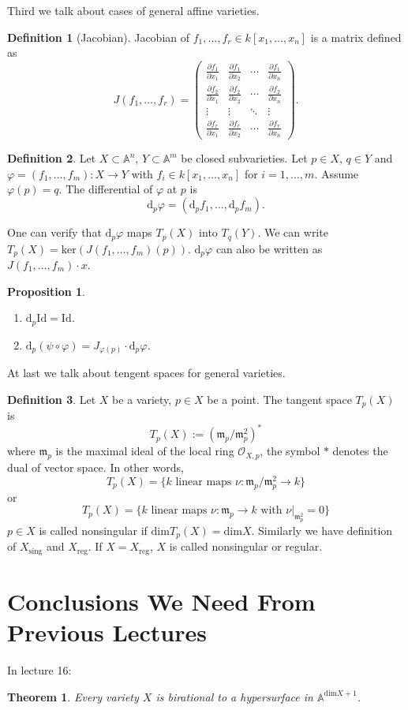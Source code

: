 \documentclass{amsart}
\theoremstyle{plain}
\newtheorem{theorem}{Theorem}
\newtheorem{proposition}{Proposition}
\theoremstyle{definition}
\newtheorem{definition}{Definition}
\theoremstyle{remark}
\numberwithin{equation}{section}
\begin{document}
Third we talk about  cases of general affine varieties.
\begin{definition}[Jacobian]
	Jacobian of $ f_1,\dots,f_r\in k[x_1,\dots,x_n] $ is a matrix defined as
	$$
	J(f_1,\dots,f_r)=\left(\begin{matrix}
	\frac{\partial f_1}{\partial x_1} & \frac{\partial f_1}{\partial x_2} &\cdots &\frac{\partial f_1}{\partial x_n}\\
	\frac{\partial f_2}{\partial x_1} & \frac{\partial f_2}{\partial x_2} & \cdots & \frac{\partial f_2}{\partial x_n}\\
	\vdots & \vdots & \ddots & \vdots\\
	\frac{\partial f_r}{\partial x_1} & \frac{\partial f_r}{\partial x_2} & \cdots & \frac{\partial f_r}{\partial x_n} 
	\end{matrix}\right) .
	$$
\end{definition}
\begin{definition}
	Let $ X\subset \mathbb{A}^n $, $ Y\subset \mathbb{A}^m $ be closed subvarieties. Let $ p\in X $, $ q\in Y $ and $ \varphi = (f_1,\dots,f_m):X\to Y $ with $ f_i\in k[x_1,\dots,x_n] $ for $ i=1,\dots,m $. Assume $ \varphi(p)=q $. The differential of $ \varphi $ at $ p $ is 
	$$
	\mathrm{d}_p\varphi = (\mathrm{d}_pf_1,\dots,\mathrm{d}_pf_m).
	$$
\end{definition}
One can verify that $ \mathrm{d}_p\varphi $ maps $ T_p(X) $ into $ T_q(Y) $. We can write $ T_p(X) = \mathrm{ker}(J(f_1,\dots,f_m)(p)) $. $ \mathrm{d}_p\varphi  $ can also be written as $ J(f_1,\dots,f_m)\cdot x $.
\begin{proposition}
	\begin{enumerate}
		\item $ \mathrm{d}_p\mathrm{Id}=\mathrm{Id} $.
		\item $ \mathrm{d}_p(\psi\circ\varphi)=J_{\varphi(p)} \cdot\mathrm{d}_p\varphi $.
	\end{enumerate}
\end{proposition}

At last we talk about tengent spaces for general varieties.
\begin{definition}
	Let $ X $ be a variety, $ p\in X $ be a point. The tangent space $ T_p(X) $ is 
	$$
	T_p(X):=(\mathfrak{m}_p/\mathfrak{m}_p^2)^{\ast}
	$$
	where $ \mathfrak{m}_p $ is the maximal ideal of the local ring $ \mathcal{O}_{X,p} $, the symbol $ \ast $ denotes the dual of vector space. In other words, 
	$$
	T_p(X)=\lbrace k \text{ linear maps }\nu: \mathfrak{m}_p/\mathfrak{m}_p^2\to k \rbrace
	$$
	or 
	$$
	T_p(X)=\lbrace k \text{ linear maps }\nu: \mathfrak{m}_p\to k \text{ with } \nu|_{\mathfrak{m}_p^2}=0  \rbrace
	$$
	$ p\in X $ is called nonsingular if $ \mathrm{dim}T_p(X)=\mathrm{dim}X $. Similarly we have definition of $ X_{\mathrm{sing}} $ and $ X_{\mathrm{reg}}.$ If $ X=X_{\mathrm{reg}} $, $ X $ is called nonsingular or regular.
\end{definition}
\section{Conclusions We Need From Previous Lectures}
In lecture 16:
\begin{theorem}\label{16-2}
	Every variety $ X $ is birational to a hypersurface in $ \mathbb{A}^{\text{dim}X+1} $.
\end{theorem}


\end{document}
